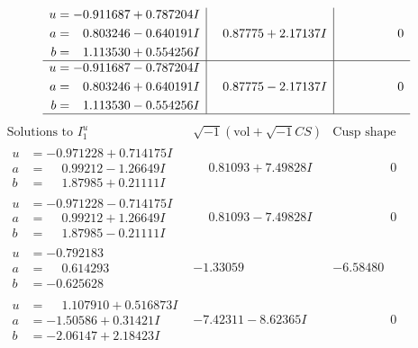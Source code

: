 \documentclass[1p]{elsarticle_modified}
\theoremstyle{definition}
\newcommand{\I}{\sqrt{-1}}
\begin{document}
$$\begin{array}{c|c|c}
\begin{aligned}
u &= -0.911687 + 0.787204 I \\
a &= \phantom{-}0.803246 - 0.640191 I \\
b &= \phantom{-}1.113530 + 0.554256 I\end{aligned}
 & \phantom{-}0.87775 + 2.17137 I & \phantom{-0.000000 } 0 \\ \hline\begin{aligned}
u &= -0.911687 - 0.787204 I \\
a &= \phantom{-}0.803246 + 0.640191 I \\
b &= \phantom{-}1.113530 - 0.554256 I\end{aligned}
 & \phantom{-}0.87775 - 2.17137 I & \phantom{-0.000000 } 0\\
 \hline 
 \end{array}$$\newpage$$\begin{array}{c|c|c}  
\text{Solutions to }I^u_{1}& \I (\text{vol} + \sqrt{-1}CS) & \text{Cusp shape}\\
 \hline 
\begin{aligned}
u &= -0.971228 + 0.714175 I \\
a &= \phantom{-}0.99212 - 1.26649 I \\
b &= \phantom{-}1.87985 + 0.21111 I\end{aligned}
 & \phantom{-}0.81093 + 7.49828 I & \phantom{-0.000000 } 0 \\ \hline\begin{aligned}
u &= -0.971228 - 0.714175 I \\
a &= \phantom{-}0.99212 + 1.26649 I \\
b &= \phantom{-}1.87985 - 0.21111 I\end{aligned}
 & \phantom{-}0.81093 - 7.49828 I & \phantom{-0.000000 } 0 \\ \hline\begin{aligned}
u &= -0.792183\phantom{ +0.000000I} \\
a &= \phantom{-}0.614293\phantom{ +0.000000I} \\
b &= -0.625628\phantom{ +0.000000I}\end{aligned}
 & -1.33059\phantom{ +0.000000I} & -6.58480\phantom{ +0.000000I} \\ \hline\begin{aligned}
u &= \phantom{-}1.107910 + 0.516873 I \\
a &= -1.50586 + 0.31421 I \\
b &= -2.06147 + 2.18423 I\end{aligned}
 & -7.42311 - 8.62365 I & \phantom{-0.000000 } 0 \\ \hline\begin{aligned}

\end{aligned}
\end{array}$$
\end{document}
